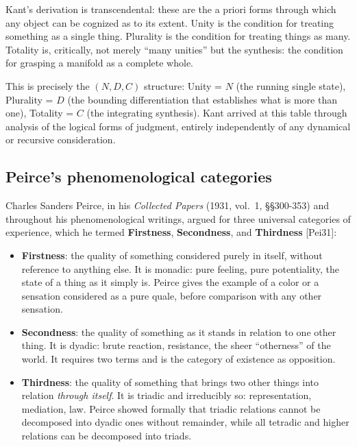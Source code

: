 \documentclass[12pt]{article}
\providecommand{\tightlist}{%
  \setlength{\itemsep}{0pt}\setlength{\parskip}{0pt}}
\begin{document}
Kant's derivation is transcendental: these are the a priori forms
through which any object can be cognized as to its extent. Unity is the
condition for treating something as a single thing. Plurality is the
condition for treating things as many. Totality is, critically, not
merely ``many unities'' but the synthesis: the condition for grasping a
manifold as a complete whole.

This is precisely the \((N, D, C)\) structure: Unity = \(N\) (the
running single state), Plurality = \(D\) (the bounding differentiation
that establishes what is more than one), Totality = \(C\) (the
integrating synthesis). Kant arrived at this table through analysis of
the logical forms of judgment, entirely independently of any dynamical
or recursive consideration.

\subsection{Peirce's phenomenological categories}\label{peirces-phenomenological-categories}

Charles Sanders Peirce, in his \emph{Collected Papers} (1931, vol.~1,
§§300-353) and throughout his phenomenological writings, argued for
three universal categories of experience, which he termed
\textbf{Firstness}, \textbf{Secondness}, and \textbf{Thirdness}
{[}Pei31{]}:

\begin{itemize}
\tightlist
\item
  \textbf{Firstness}: the quality of something considered purely in
  itself, without reference to anything else. It is monadic: pure
  feeling, pure potentiality, the state of a thing as it simply is.
  Peirce gives the example of a color or a sensation considered as a
  pure quale, before comparison with any other sensation.
\item
  \textbf{Secondness}: the quality of something as it stands in relation
  to one other thing. It is dyadic: brute reaction, resistance, the
  sheer ``otherness'' of the world. It requires two terms and is the
  category of existence as opposition.
\item
  \textbf{Thirdness}: the quality of something that brings two other
  things into relation \emph{through itself}. It is triadic and
  irreducibly so: representation, mediation, law. Peirce showed formally
  that triadic relations cannot be decomposed into dyadic ones without
  remainder, while all tetradic and higher relations can be decomposed
  into triads.
\end{itemize}
\end{document}
